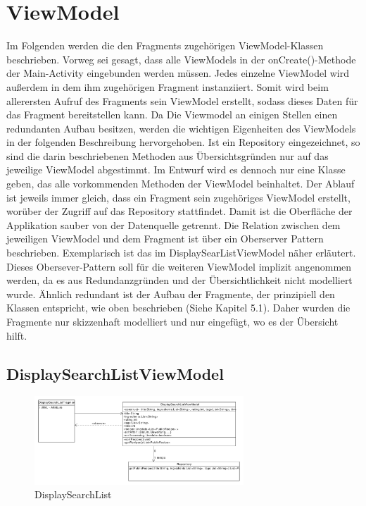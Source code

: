 \section{ViewModel}
Im Folgenden werden die den Fragments zugehörigen ViewModel-Klassen beschrieben.
Vorweg sei gesagt, dass alle ViewModels in der onCreate()-Methode der Main-Activity eingebunden werden müssen.
Jedes einzelne ViewModel wird außerdem in dem ihm zugehörigen Fragment instanziiert. Somit wird beim allerersten Aufruf des Fragments sein ViewModel erstellt, sodass dieses Daten für das Fragment bereitstellen kann.
Da Die Viewmodel an einigen Stellen einen redundanten Aufbau besitzen, werden die wichtigen Eigenheiten des ViewModels in der folgenden Beschreibung hervorgehoben. Ist ein Repository eingezeichnet, so sind die darin  beschriebenen Methoden aus Übersichtsgründen nur auf das jeweilige ViewModel abgestimmt. Im Entwurf wird es dennoch nur eine Klasse geben, das alle vorkommenden Methoden der ViewModel beinhaltet. Der Ablauf ist jeweils immer gleich, dass ein Fragment sein zugehöriges ViewModel erstellt, worüber der Zugriff auf das Repository stattfindet. Damit ist die Oberfläche der Applikation sauber von der Datenquelle getrennt. Die Relation zwischen dem jeweiligen ViewModel und dem Fragment ist über ein Oberserver Pattern beschrieben. Exemplarisch ist das im DisplaySearListViewModel näher erläutert. Dieses Obersever-Pattern soll für die weiteren ViewModel implizit angenommen werden, da es aus Redundanzgründen und der Übersichtlichkeit nicht modelliert wurde. Ähnlich redundant ist der Aufbau der Fragmente, der prinzipiell den Klassen entspricht, wie oben beschrieben  (Siehe Kapitel 5.1). Daher wurden die Fragmente nur skizzenhaft modelliert und nur eingefügt, wo es der Übersicht hilft.

\subsection{DisplaySearchListViewModel}
\begin{figure}[H]
	\centering
	\includegraphics[width=0.7\textwidth]{pics/viewModel/Display_Search_List_ViewModel.pdf}%
	\caption{DisplaySearchList}%
	\label{viewModel}%
\end{figure}

